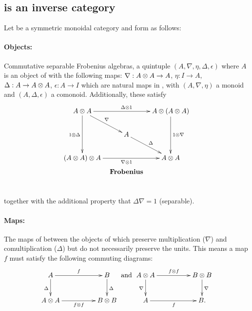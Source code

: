 \subsection{\CFrob is an inverse category}\label{ssec:cfrob_x_is_an_inverse_category}
\begin{example}\label{example:commfrob}
  Let \X be a symmetric monoidal category and form \CFrob as follows: \paragraph{\textbf{Objects:}}
  Commutative separable Frobenius algebras, a quintuple $(A,\nabla,\eta,\Delta,\epsilon)$ where
  $A$ is an object of \X with the following maps:
  $\nabla :A\otimes A \to A$, $\eta:I\to A$, $\Delta : A \to A\otimes A$, $\epsilon : A \to I$ which are natural
  maps in \X, with $(A,\nabla,\eta)$ a monoid and $(A,\Delta,\epsilon)$ a comonoid. Additionally,
  these satisfy
  \[
    \xymatrix @C=10pt @R=20pt{
      A \* A \ar[dd]_{1\*\Delta} \ar[dr]^{\nabla}
        \ar[rr]^{\Delta \* 1} & &
        A \* (A \* A) \ar[dd]^{1 \* \nabla}\\
      & A \ar[dr]^{\Delta} & \\
      (A \* A) \* A \ar[rr]_{\nabla \* 1} & &
        A \* A\\
      &*!<0pt,-25pt>{\text{\textbf{Frobenius}}}
    }
  \]
  together with the additional property that $\Delta \nabla = 1$ (separable).

  \paragraph{\textbf{Maps:}} The maps of \X between the objects of \X which preserve multiplication ($\nabla$)
  and comultiplication ($\Delta$) but do not necessarily preserve the units.
  This means a map $f$ must satisfy the following commuting diagrams:
  \[
    \xymatrix@C+25pt{
      A \ar[d]_{\Delta} \ar[r]^{f} & B \ar[d]^{\Delta}\\
      A\*A \ar[r]_{f\*f} & B\* B
    }
    \text{ and }
    \xymatrix@C+25pt{
      A\*A \ar[d]_{\nabla} \ar[r]^{f\*f}& B\*B \ar[d]^{\nabla}\\
      A \ar[r]_{f} & B.
    }
  \]
\end{example}

